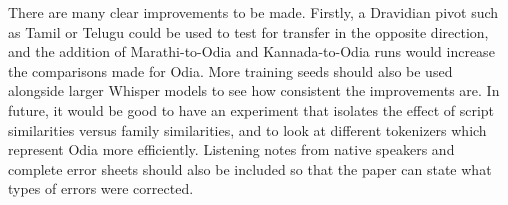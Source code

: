 \documentclass[conference]{IEEEtran}
\begin{document}
There are many clear improvements to be made. Firstly, a Dravidian pivot such as Tamil or Telugu could be used to test for transfer in the opposite direction, and the addition of Marathi-to-Odia and Kannada-to-Odia runs would increase the comparisons made for Odia. More training seeds should also be used alongside larger Whisper models to see how consistent the improvements are. In future, it would be good to have an experiment that isolates the effect of script similarities versus family similarities, and to look at different tokenizers which represent Odia more efficiently. Listening notes from native speakers and complete error sheets should also be included so that the paper can state what types of errors were corrected.

\end{document}
